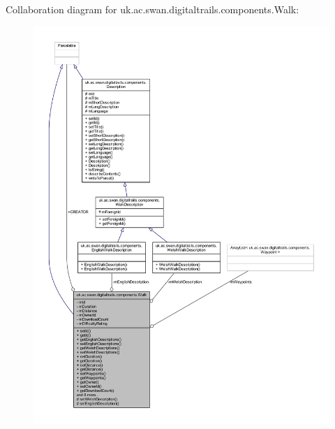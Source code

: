 Collaboration diagram for uk.\+ac.\+swan.\+digitaltrails.\+components.\+Walk\+:
\nopagebreak
\begin{figure}[H]
\begin{center}
\leavevmode
\includegraphics[width=350pt]{classuk_1_1ac_1_1swan_1_1digitaltrails_1_1components_1_1_walk__coll__graph}
\end{center}
\end{figure}
